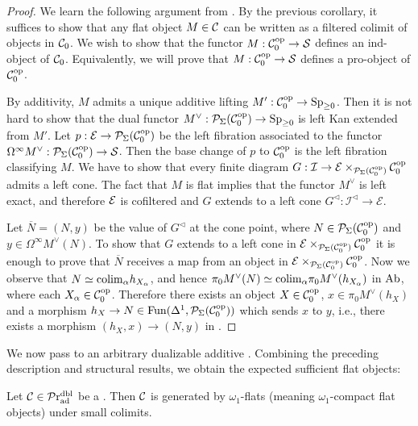\documentclass[a4paper,10pt, oneside]{amsart}
\begin{document}
	\begin{proof}
		We learn the following argument from \cite[Proposition 2.2.22]{stefanich2023classification}. By the previous corollary, it suffices to show that any flat object $M\in\mathcal{C}$ can be written as a filtered colimit of objects in $\mathcal{C}_0$. We wish to show that the functor $M:\mathcal{C}_0^{\mathrm{op}}\to\mathcal{S}$ defines an ind-object of $\mathcal{C}_0$. Equivalently, we will prove that $M:\mathcal{C}_0^{\mathrm{op}}\to\mathcal{S}$  defines a pro-object of $\mathcal{C}_0^{\mathrm{op}}$. 
		
		By additivity, $M$ admits a unique additive lifting $M':\mathcal{C}_0^{\mathrm{op}}\to\operatorname{Sp}_{\geq0}$. Then it is not hard to show that the dual functor $M^\vee: \mathcal{P}_\Sigma(\mathcal{C}_0^{\mathrm{op}})\to \operatorname{Sp}_{\geq0}$ is left Kan extended from $M'$. Let $p: \mathcal{E} \rightarrow \mathcal{P}_\Sigma(\mathcal{C}_0^{\mathrm{op}})$ be the left fibration associated to the functor $\Omega^\infty M^\vee: \mathcal{P}_\Sigma(\mathcal{C}_0^{\mathrm{op}})\to\mathcal{S}$. Then the base change of $p$ to $\mathcal{C}_0^{\mathrm{op}}$ is the left fibration classifying $M$. We have to show that every finite diagram $G: \mathcal{I} \rightarrow \mathcal{E} \times_{\mathcal{P}_\Sigma(\mathcal{C}_0^{\mathrm{op}})} \mathcal{C}_0^{\mathrm{op}}$ admits a left cone. The fact that $M$ is flat implies that the functor $M^\vee$ is left exact, and therefore $\mathcal{E}$ is cofiltered and $G$ extends to a left cone $G^{\triangleleft}: \mathcal{I}^{\triangleleft} \rightarrow \mathcal{E}$.
		
		
		Let $\overline{N}=(N,y) $ be the value of $G^{\triangleleft}$ at the cone point, where $N\in \mathcal{P}_\Sigma(\mathcal{C}_0^{\mathrm{op}})$ and $y\in \Omega^\infty M^\vee(N)$. To show that $G$ extends to a left cone in $\mathcal{E} \times_{\mathcal{P}_\Sigma(\mathcal{C}_0^{\mathrm{op}})} \mathcal{C}_0^{\mathrm{op}}$ it is enough to prove that $\overline{N}$ receives a map from an object in $\mathcal{E} \times_{\mathcal{P}_\Sigma(\mathcal{C}_0^{\mathrm{op}})} \mathcal{C}_0^{\mathrm{op}}$. Now we observe that $N\simeq\mathrm{colim}_\alpha h_{X_\alpha}$,  and hence $\pi_0M^\vee(N)\simeq \mathrm{colim}_\alpha \pi_0M^\vee(h_{X_\alpha})$ in $\mathrm{Ab}$, where  each $X_\alpha\in \mathcal{C}_0^{\mathrm{op}}$. Therefore there exists an object $X\in\mathcal{C}_0^{\mathrm{op}}$, $x\in \pi_0M^\vee(h_X)$ and a morphism $h_X\to N \in \operatorname{Fun}(\Delta^1,\mathcal{P}_\Sigma(\mathcal{C}_0^{\mathrm{op}}))$ which sends $x$ to $y$, i.e., there exists a morphism $(h_X,x)\to (N,y)$ in \mce.
	\end{proof}
	We now pass to an arbitrary dualizable additive \infcat. Combining the preceding description and structural results, we obtain the expected sufficient flat objects:
	\begin{thm}\label{flatgenerate}
		Let $\mathcal{C}\in\mathcal{P}\mathrm{r}_{\mathrm{ad}}^{\mathrm{dbl}}$ be a \dualaddinfcat. Then $\mathcal{C}$ is generated by $\omega_1$-flats (meaning $\omega_1$-compact flat objects) under small colimits.
	\end{thm}
\end{document}
